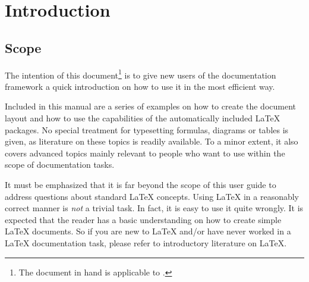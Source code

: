 
\section[Introduction]{Introduction}
\label{sec:introduction}



\subsection[Scope]{Scope}
\label{subsec:scope}

The intention of this document\footnote{The document in hand is applicable
  to \p.} is to give new users of
the \wegcLaTeX{} documentation framework a quick introduction on how to use
it in the most efficient way.

Included in this manual are a series of examples on how to create the document layout and how to
use the capabilities of the automatically included \LaTeX{} packages.
No special treatment for typesetting formulas, diagrams or tables is given, as literature
on these topics is readily available.
To a minor extent, it also covers advanced topics mainly relevant to people who want to use \wegcLaTeX{}
within the scope of documentation tasks.

It must be emphasized that it is far beyond the scope of this user guide to address questions about
standard \LaTeX{} concepts. Using \LaTeX{} in a reasonably correct manner is \emph{not} a trivial task.
In fact, it is easy to use it quite wrongly.
It is expected that the reader has a basic understanding on how to create simple \LaTeX{} documents.
So if you are new to \LaTeX{} and/or have never worked in a \LaTeX{} documentation task,
please refer to introductory literature on \LaTeX{}.

